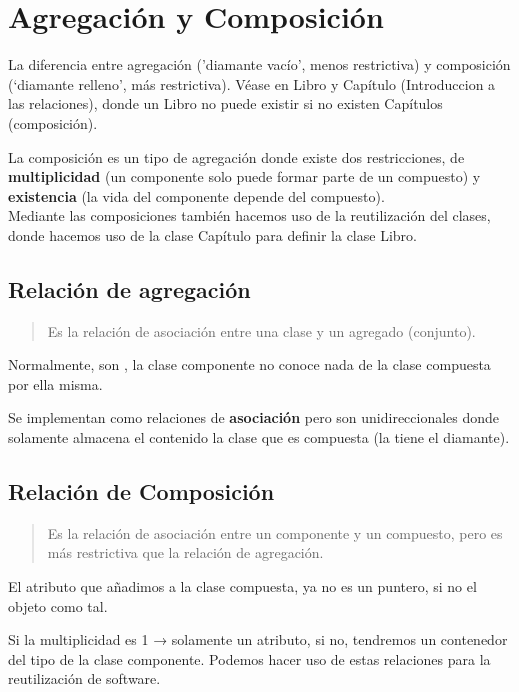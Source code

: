 \chapter{Agregación y Composición}
La diferencia entre agregación (’diamante vacío’, menos restrictiva) y composición (‘diamante relleno’, más restrictiva).
Véase en Libro y Capítulo (Introduccion a las relaciones), donde un Libro no puede existir si no existen Capítulos (composición).

La composición es un tipo de agregación donde existe dos restricciones, de \textbf{multiplicidad} (un componente solo puede formar parte de un compuesto) y \textbf{existencia} (la vida del componente depende del compuesto).\\
Mediante las composiciones también hacemos uso de la reutilización del clases, donde hacemos uso de la clase Capítulo para definir la clase Libro.
\vspace{-0.5cm}
\section{Relación de agregación}
\begin{quote}
	Es la relación de asociación entre una clase y un agregado (conjunto).
\end{quote}
Normalmente, son , la clase componente no conoce nada de la clase compuesta por ella misma.

Se implementan como relaciones de \textbf{asociación} pero son unidireccionales donde solamente almacena el contenido
la clase que es compuesta (la tiene el diamante).

\vspace{-0.5cm}
\section{Relación de Composición}
\begin{quote}
	Es la relación de asociación entre un componente y un compuesto, pero es más restrictiva que la relación de agregación.
\end{quote}
El atributo que añadimos a la clase compuesta, ya no es un puntero, si no el objeto como tal.

Si la multiplicidad es 1 → solamente un atributo, si no, tendremos un contenedor del tipo de la clase componente.
Podemos hacer uso de estas relaciones para la reutilización de software.
